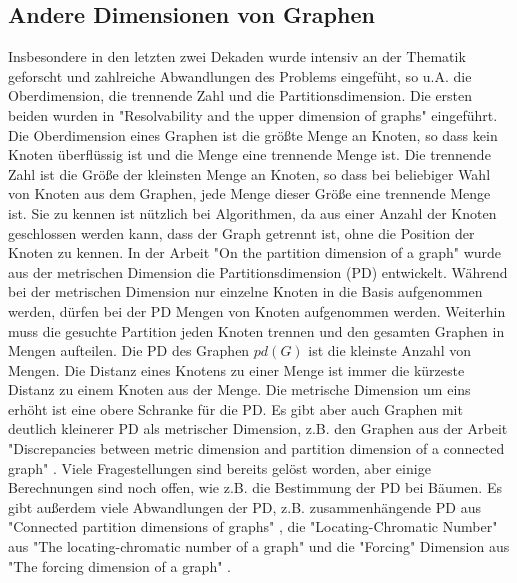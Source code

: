 \subsection{Andere Dimensionen von Graphen}
\vspace{-2mm}
Insbesondere in den letzten zwei Dekaden wurde intensiv an der Thematik geforscht und zahlreiche Abwandlungen des Problems eingefüht, so u.A. die Oberdimension, die trennende Zahl und die Partitionsdimension.\newline
Die ersten beiden wurden in "Resolvability and the upper dimension of graphs" \cite{upper} eingeführt. Die Oberdimension eines Graphen ist die größte Menge an Knoten, so dass kein Knoten überflüssig ist und die Menge eine trennende Menge ist. Die trennende Zahl ist die Größe der kleinsten Menge an Knoten, so dass bei beliebiger Wahl von Knoten aus dem Graphen, jede Menge dieser Größe eine trennende Menge ist. Sie zu kennen ist nützlich bei Algorithmen, da aus einer Anzahl der Knoten geschlossen werden kann, dass der Graph getrennt ist, ohne die Position der Knoten zu kennen.
\vspace{-1.5mm}\newline\newline 
In der Arbeit "On the partition dimension of a graph" \cite{partit} wurde aus der metrischen Dimension die Partitionsdimension (PD) entwickelt. Während bei der metrischen Dimension nur einzelne Knoten in die Basis aufgenommen werden, dürfen bei der PD Mengen von Knoten aufgenommen werden. Weiterhin muss die gesuchte Partition jeden Knoten trennen und den gesamten Graphen in Mengen aufteilen. Die PD des Graphen $pd(G)$ ist die kleinste Anzahl von Mengen. Die Distanz eines Knotens zu einer Menge ist immer die kürzeste Distanz zu einem Knoten aus der Menge.\newline
Die metrische Dimension um eins erhöht ist eine obere Schranke für die PD\cite{partit}. Es gibt aber auch Graphen mit deutlich kleinerer PD als metrischer Dimension, z.B. den Graphen aus der Arbeit "Discrepancies between metric dimension and partition dimension of a connected graph" \cite{disc}. Viele Fragestellungen sind bereits gelöst worden, aber einige Berechnungen sind noch offen, wie z.B. die Bestimmung der PD bei Bäumen. Es gibt außerdem viele Abwandlungen der PD, z.B. zusammenhängende PD aus "Connected partition dimensions of graphs" \cite{con}, die "Locating-Chromatic Number" aus "The locating-chromatic number of a graph" \cite{loc} und die "Forcing" Dimension aus "The forcing dimension of a graph" \cite{forcing}.
\vspace{-4mm}
